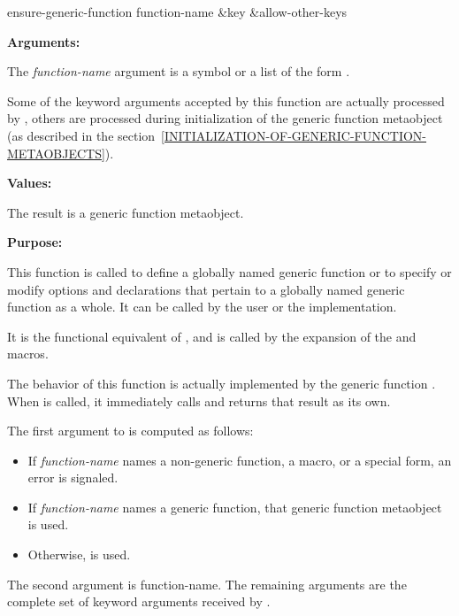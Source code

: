 \begin{defun}[Function]
ensure-generic-function function-name &key &allow-other-keys

\textbf{Arguments:}

The \emph{function-name} argument is a symbol or a list of the form .

Some of the keyword arguments accepted by this function are actually processed
by , others are processed during
initialization of the generic function metaobject (as described in the
section~\ref{INITIALIZATION-OF-GENERIC-FUNCTION-METAOBJECTS}).

\textbf{Values:}

The result is a generic function metaobject.

\textbf{Purpose:}

This function is called to define a globally named generic function or to
specify or modify options and declarations that pertain to a globally named
generic function as a whole. It can be called by the user or the implementation.

It is the functional equivalent of , and is called by the expansion of
the  and  macros.

The behavior of this function is actually implemented by the generic function
. When  is
called, it immediately calls  and
returns that result as its own.

The first argument to  is computed as follows:

\begin{itemize}
\item If \emph{function-name} names a non-generic function, a macro, or a
  special form, an error is signaled.
\item If \emph{function-name} names a generic function, that generic function
  metaobject is used.
\item Otherwise,  is used.
\end{itemize}

The second argument is function-name. The remaining arguments are the complete
set of keyword arguments received by .
\end{defun}

